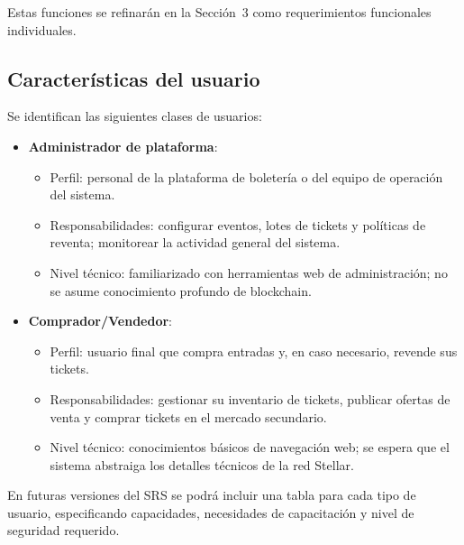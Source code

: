 \documentclass[12pt,letterpaper]{article}
\begin{document}
Estas funciones se refinarán en la Sección~3 como requerimientos funcionales
individuales.

\subsection{Características del usuario}

Se identifican las siguientes clases de usuarios:

\begin{itemize}
    \item \textbf{Administrador de plataforma}:
          \begin{itemize}
              \item Perfil: personal de la plataforma de boletería o del equipo
                    de operación del sistema.
              \item Responsabilidades: configurar eventos, lotes de tickets y
                    políticas de reventa; monitorear la actividad general del
                    sistema.
              \item Nivel técnico: familiarizado con herramientas web de
                    administración; no se asume conocimiento profundo de
                    blockchain.
          \end{itemize}
    \item \textbf{Comprador/Vendedor}:
          \begin{itemize}
              \item Perfil: usuario final que compra entradas y, en caso
                    necesario, revende sus tickets.
              \item Responsabilidades: gestionar su inventario de tickets,
                    publicar ofertas de venta y comprar tickets en el mercado
                    secundario.
              \item Nivel técnico: conocimientos básicos de navegación web; se
                    espera que el sistema abstraiga los detalles técnicos de
                    la red Stellar.
          \end{itemize}
\end{itemize}

En futuras versiones del SRS se podrá incluir una tabla para cada tipo de
usuario, especificando capacidades, necesidades de capacitación y nivel de
seguridad requerido.
\end{document}
